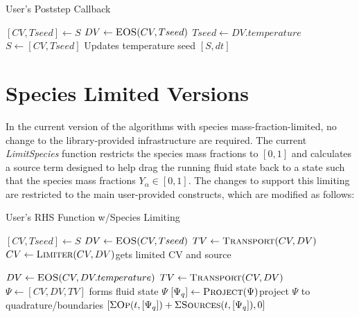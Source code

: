 \documentclass{article}
\begin{document}
\begin{algorithm}
  \caption{User's Poststep Callback}
  \begin{algorithmic}[1]
    \State $[CV, Tseed] \gets S$
    \State $DV \gets \Call{EOS}{CV, Tseed}$
    \State $Tseed \gets DV.temperature$
    \State $S \gets [CV, Tseed]$ \Comment Updates temperature seed
    \State \Return $[S, dt]$
    \EndProcedure  \end{algorithmic}
\end{algorithm}


\section{Species Limited Versions}
In the current version of the algorithms with species mass-fraction-limited, no change to the library-provided infrastructure are required.  The current \textit{LimitSpecies} function restricts the species mass fractions to $[0, 1]$ and calculates a source term designed to help drag the running fluid state back to a state such that the species mass fractions $Y_\alpha \in [0, 1]$.  The changes to support this limiting are restricted to the main user-provided constructs, which are modified as follows:

%
\begin{algorithm}
  \caption{User's RHS Function w/Species Limiting}
  \begin{algorithmic}[1]
    \State $[CV, Tseed] \gets S$
    \State $DV \gets \Call{EOS}{CV, Tseed}$
    \State $TV \gets \Call{Transport}{CV, DV}$
    \State $CV \gets \Call{Limiter}{CV, DV}$\Comment gets limited CV and source
 
    \State $DV \gets \Call{EOS}{CV, DV.temperature}$
    \State $TV \gets \Call{Transport}{CV, DV}$
    \State $\Psi \gets [CV, DV, TV]$ \Comment forms fluid state $\Psi$
    \State $[\Psi_q] \gets \Call{Project}{\Psi}$\Comment project $\Psi$ to quadrature/boundaries
    \State \Return $[\Sigma\Call{Op}{t, [\Psi_q]} + \Sigma\Call{Sources}{t, [\Psi_q]}, 0]$
    \EndProcedure  \end{algorithmic}
\end{algorithm}
\end{document}

